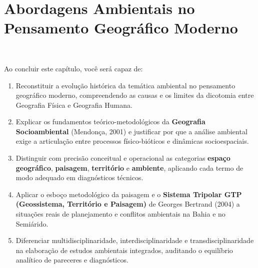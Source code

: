 
\chapter[Abordagens Ambientais na Geografia Moderna]{Abordagens Ambientais no Pensamento Geográfico Moderno}
\label{cap:abordagens-geografia}

\noindent\tagEmenta\ 

\vspace{4pt}

\begin{capObjetivos}
Ao concluir este capítulo, você será capaz de:
\begin{enumerate}[leftmargin=1.6em, itemsep=2.5pt]
  \item Reconstituir a evolução histórica da temática ambiental no pensamento geográfico moderno, compreendendo as causas e os limites da dicotomia entre Geografia Física e Geografia Humana.
  \item Explicar os fundamentos teórico-metodológicos da \textbf{Geografia Socioambiental} (Mendonça, 2001) e justificar por que a análise ambiental exige a articulação entre processos físico-bióticos e dinâmicas socioespaciais.
  \item Distinguir com precisão conceitual e operacional as categorias \textbf{espaço geográfico}, \textbf{paisagem}, \textbf{território} e \textbf{ambiente}, aplicando cada termo de modo adequado em diagnósticos técnicos.
  \item Aplicar o esboço metodológico da paisagem e o \textbf{Sistema Tripolar GTP (Geossistema, Território e Paisagem)} de Georges Bertrand (2004) a situações reais de planejamento e conflitos ambientais na Bahia e no Semiárido.
  \item Diferenciar multidisciplinaridade, interdisciplinaridade e transdisciplinaridade na elaboração de estudos ambientais integrados, auditando o equilíbrio analítico de pareceres e diagnósticos.
\end{enumerate}
\end{capObjetivos}

